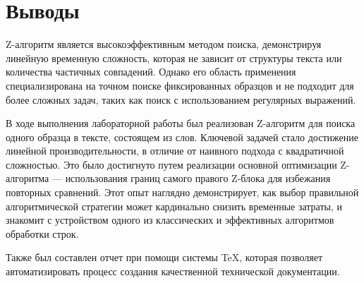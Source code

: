 \section{Выводы}
Z-алгоритм является высокоэффективным методом поиска, демонстрируя линейную временную сложность, которая не зависит от структуры текста или количества частичных совпадений. Однако его область применения специализирована на точном поиске фиксированных образцов и не подходит для более сложных задач, таких как поиск с использованием регулярных выражений.

В ходе выполнения лабораторной работы был реализован Z-алгоритм для поиска одного образца в тексте, состоящем из слов. Ключевой задачей стало достижение линейной производительности, в отличие от наивного подхода с квадратичной сложностью. Это было достигнуто путем реализации основной оптимизации Z-алгоритма — использования границ самого правого Z-блока для избежания повторных сравнений. Этот опыт наглядно демонстрирует, как выбор правильной алгоритмической стратегии может кардинально снизить временные затраты, и знакомит с устройством одного из классических и эффективных алгоритмов обработки строк.

Также был составлен отчет при помощи системы \TeX, которая позволяет автоматизировать процесс создания качественной технической документации.
\pagebreak